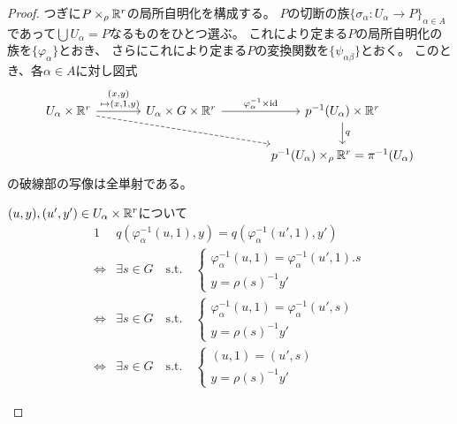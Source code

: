 \documentclass[report]{jlreq}
\begin{document}
\begin{proof}
    つぎに$P \times_\rho \mathbb{R}^r$の局所自明化を構成する。
    $P$の切断の族$\{ \sigma_\alpha \colon U_\alpha \to P \}_{\alpha \in A}$
    であって$\bigcup U_\alpha = P$なるものをひとつ選ぶ。
    これにより定まる$P$の局所自明化の族を$\{ \varphi_\alpha \}$とおき、
    さらにこれにより定まる$P$の変換関数を$\{ \psi_{\alpha\beta} \}$とおく。
    このとき、各$\alpha \in A$に対し図式
    \begin{equation}
        \begin{tikzcd}[column sep=large]
            U_\alpha  \times \R^r
                \ar[dashed]{drr}
                \ar{r}{\substack{(x, y) \\ \; \mapsto (x, 1, y)}}
                & U_\alpha \times G \times \R^r
                \ar{r}{\varphi_\alpha^{-1} \times \id}
                & p^{-1}(U_\alpha) \times \R^r
                \ar{d}{q} \\
            && p^{-1}(U_\alpha) \times_\rho \R^r
                = \pi^{-1}(U_\alpha)
        \end{tikzcd}
    \end{equation}
    の破線部の写像は全単射である。
    \begin{innerproof}
        $(u, y), (u', y') \in U_\alpha \times \mathbb{R}^r$について
        \begin{alignat}{1}
                &q(\varphi_\alpha^{-1}(u, 1), y)
                    = q(\varphi_\alpha^{-1}(u', 1), y') \\
            \iff
                &\exists s \in G
                \quad \text{s.t.} \quad
                \begin{cases}
                    \varphi_\alpha^{-1}(u, 1) = \varphi_\alpha^{-1}(u', 1) . s \\
                    y = \rho(s)^{-1} y'
                \end{cases} \\
            \iff
                &\exists s \in G
                \quad \text{s.t.} \quad
                \begin{cases}
                    \varphi_\alpha^{-1}(u, 1) = \varphi_\alpha^{-1}(u', s) \\
                    y = \rho(s)^{-1} y'
                \end{cases} \\
            \iff
                &\exists s \in G
                \quad \text{s.t.} \quad
                \begin{cases}
                    (u, 1) = (u', s) \\
                    y = \rho(s)^{-1} y'

\end{cases}
\end{alignat}
\end{innerproof}
\end{proof}
\end{document}
